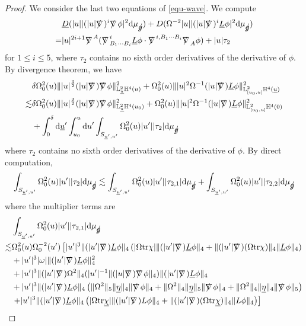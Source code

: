 \documentclass[11pt,reqno]{amsart}
\theoremstyle{definition}
\numberwithin{equation}{section}
\newcommand{\D}{\mathrm{d}}
\newcommand{\tr}{\mathrm{tr}}
\renewcommand{\L}{\mathbb{L}}
\renewcommand{\H}{\mathbb{H}}
\def\chib{\underline{\chi}}
\def\etab{\underline{\eta}}
\def\Lb{\underline{L}}
\def\tr{\mathrm{tr}}
\def\ub{\underline{u}}
\newcommand{\Db}{\underline{D}}
\def\nablas{\mbox{$\nabla \mkern -13mu /$ }}
\def\gs{\mbox{$g \mkern -9mu /$}}
\begin{document}
\begin{proof}
We consider the last two equations of \eqref{equ-wave}. We compute
\begin{align*}
&\Db(|u||(|u|\nablas)^i\nablas\phi|^2\D\mu_{\gs})+D(\Omega^{-2}|u||(|u|\nablas)^i\Lb\phi|^2\D\mu_{\gs})\\
=&|u|^{2i+1}\nablas^A(\nablas^i_{B_1\cdots B_i}\Lb\phi\cdot\nablas^{i,B_1\cdots B_i}\nablas_A\phi)+|u|\tau_2
\end{align*}
for $1\le i\le 5$, where $\tau_2$ contains no sixth order derivatives of the derivative of $\phi$. By divergence theorem, we have
\begin{align*}
&\delta\Omega_0^2(u)\||u|^{\frac{3}{2}}(|u|\nablas)\nablas\phi\|_{\L^2_{\ub}\H^4(u)}^2+\Omega_0^2(u)\||u|^{2}\Omega^{-1}(|u|\nablas)\Lb\phi\|_{\L^2_{[u_0,u]}\H^4(\ub)}^2\\
\lesssim&\delta\Omega_0^2(u)\||u|^{\frac{3}{2}}(|u|\nablas)\nablas\phi\|_{\L^2_{\ub}\H^4(u_0)}^2+\Omega_0^2(u)\||u|^{2}\Omega^{-1}(|u|\nablas)\Lb\phi\|_{\L^2_{[u_0,u]}\H^4(0)}^2\\
&+\int_0^{\delta}\D\ub'\int_{u_0}^u\D u'\int_{S_{\ub',u'}}\Omega_0^2(u)|u'||\tau_2|\D\mu_{\gs}
\end{align*}
where $\tau_2$ contains no sixth order derivatives of the derivative of $\phi$. By direct computation, 
\begin{align*}
\int_{S_{\ub',u'}}\Omega_0^2(u)|u'||\tau_2|\D\mu_{\gs}\lesssim\int_{S_{\ub',u'}}\Omega_0^2(u)|u'||\tau_{2,1}|\D\mu_{\gs}+\int_{S_{\ub',u'}}\Omega_0^2(u)|u'||\tau_{2,2}|\D\mu_{\gs}
\end{align*}
where the multiplier terms are
\begin{equation}\label{tau21}
\begin{split}
&\int_{S_{\ub',u'}}\Omega_0^2(u)|u'||\tau_{2,1}|\D\mu_{\gs}\\
\lesssim
&\Omega_0^2(u)\Omega_0^{-2}(u')\left[|u'|^3\|(|u'|\nablas)\Lb\phi\|_4\left(|\Omega\tr\chi|\|(|u'|\nablas)\Lb\phi\|_4+\|(|u'|\nablas)(\Omega\tr\chi)\|_4\|\Lb\phi\|_4\right)\right.\\
&+|u'|^3|\omega|\|(|u'|\nablas)\Lb\phi\|_4^2\\
&+|u'|^3\|(|u'|\nablas)\Omega^2\|_4(|u'|^{-1}\|(|u|\nablas)\nablas\phi\|_4)\|(|u'|\nablas)\Lb\phi\|_4\\&+|u'|^3\|(|u'|\nablas)\Lb\phi\|_4\left(\|\Omega^2\|_5\|\etab\|_4\|\nablas\phi\|_4+\|\Omega^2\|_4\|\etab\|_5\|\nablas\phi\|_4+\|\Omega^2\|_4\|\etab\|_4\|\nablas\phi\|_5\right)\\
&\left.+|u'|^3\|(|u'|\nablas)\Lb\phi\|_4\left(|\Omega\tr\chib|\|(|u'|\nablas)L\phi\|_4+\|(|u'|\nablas)(\Omega\tr\chib)\|_4\|L\phi\|_4\right)\right]\\

\end{split}
\end{equation}
\end{proof}
\end{document}
